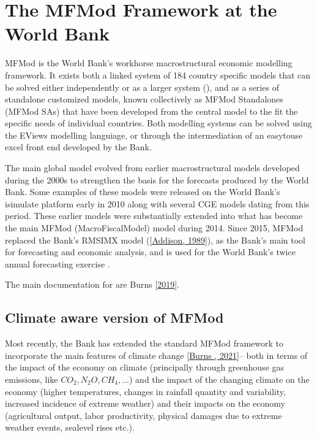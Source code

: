 \documentclass[letterpaper,10pt,english]{jupyterBook}
\begin{document}
\section{The MFMod Framework at the World Bank}
\label{\detokenize{content/01_Introduction/Introduction:the-mfmod-framework-at-the-world-bank}}
\sphinxAtStartPar
MFMod is the World Bank’s work\sphinxhyphen{}horse macro\sphinxhyphen{}structural economic modelling framework. It exists both a linked system of 184 country specific models that can be solved either independently or as a larger system (), and as a series of  standalone customized models, known collectively as MFMod Standalones (MFMod SAs) that have been developed from the central model to the fit the specific needs of individual countries. Both modelling systems can be solved using the EViews modelling languiage, or through the intermediation of an easy\sphinxhyphen{}to\sphinxhyphen{}use excel front end developed by the Bank.

\sphinxAtStartPar
The main  global model evolved from earlier macro\sphinxhyphen{}structural models developed during the 2000s to strengthen the basis for the forecasts produced by the World Bank. Some examples of these models were released on the World Bank’s isimulate platform early in 2010 along with several CGE models dating from this period. These earlier models were substantially extended into what has become the main MFMod (MacroFiscalModel) model during 2014. Since 2015, MFMod replaced the Bank’s RMSIM\sphinxhyphen{}X model ({[}\hyperlink{cite.content/99_BackMatter/References:id20}{Addison, 1989}{]}), as the Bank’s main tool for forecasting and economic analysis, and is used for the World Bank’s twice annual forecasting exercise .

\sphinxAtStartPar
The main documentation for  are Burns  {[}\hyperlink{cite.content/99_BackMatter/References:id15}{2019}{]}.


\subsection{Climate aware version of MFMod}
\label{\detokenize{content/01_Introduction/Introduction:climate-aware-version-of-mfmod}}
\sphinxAtStartPar
Most recently, the Bank has extended the standard MFMod framework to incorporate the main features of climate change {[}\hyperlink{cite.content/99_BackMatter/References:id14}{Burns , 2021}{]}– both in terms of the impact of the economy on climate (principally through green\sphinxhyphen{}house gas emissions, like \(CO_2, N_{2}O, CH_4, ...\)) and the impact of the changing climate on the economy (higher temperatures, changes in rainfall quantity and variability, increased incidence of extreme weather) and their impacts on the economy (agricultural output, labor productivity, physical damages due to extreme weather events, sea\sphinxhyphen{}level rises etc.).
\end{document}
